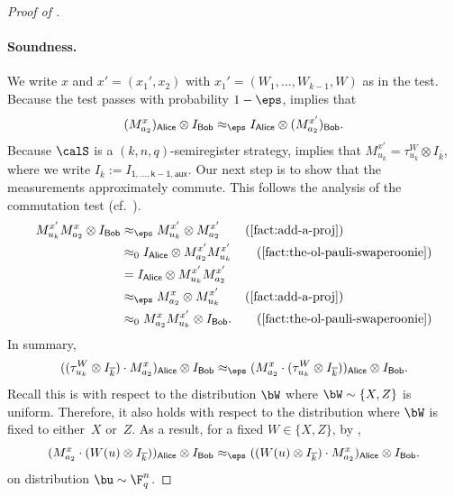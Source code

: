 \documentclass[11pt]{article}
\newcommand{\reg}[1]{{\mathsf{#1}}}
\begin{document}
\begin{proof}[Proof of ]
\paragraph{Soundness.}
We write $x$ and $x' = (x_1', x_2)$ with $x_1' = (W_1, \ldots, W_{k-1}, W)$ as in the test.
Because the test passes with probability $1-\eps$,  implies that
\begin{equation*}
(M_{a_2}^{x})_{\reg{Alice}} \otimes I_{\reg{Bob}}
\approx_{\eps} I_{\reg{Alice}} \otimes (M_{a_2}^{x'})_{\reg{Bob}}.
\end{equation*}
Because $\calS$ is a $(k,n,q)$-semiregister strategy, 
 implies that $M_{u_k}^{x'} = \tau^{W}_{u_k} \otimes I_{\overline{k}}$,
where we write $I_{\overline{k}} := I_{\reg{1, \ldots, k-1, aux}}$.
Our next step is to show that the measurements approximately commute.
This follows the analysis of the commutation test (cf.~\cite[Lemma 28]{CGJV18}).
\begin{align*}
M_{u_k}^{x'} M_{a_2}^{x} \otimes I_{\reg{Bob}}
&\approx_{\eps} M_{u_k}^{x'} \otimes M_{a_2}^{x'}\tag{\Cref{fact:add-a-proj}}\\
&\approx_{0} I_{\reg{Alice}} \otimes M_{a_2}^{x'}M_{u_k}^{x'} \tag{\Cref{fact:the-ol-pauli-swaperoonie}}\\
&= I_{\reg{Alice}} \otimes M_{u_k}^{x'}M_{a_2}^{x'}\\
&\approx_{\eps} M_{a_2}^{x} \otimes M_{u_k}^{x'}\tag{\Cref{fact:add-a-proj}}\\
&\approx_{0} M_{a_2}^x M_{u_k}^{x'} \otimes I_{\reg{Bob}}.\tag{\Cref{fact:the-ol-pauli-swaperoonie}}
\end{align*}
In summary,
\begin{equation*}
((\tau^{W}_{u_k} \otimes I_{\overline{k}})\cdot M_{a_2}^{x})_{\reg{Alice}} \otimes I_{\reg{Bob}}
\approx_{\eps} (M_{a_2}^x \cdot (\tau^{W}_{u_k} \otimes I_{\overline{k}}))_{\reg{Alice}}\otimes I_{\reg{Bob}}.
\end{equation*}
Recall this is with respect to the distribution $\bW$ where $\bW \sim \{X,Z\}$ is uniform.
Therefore, it also holds with respect to the distribution where $\bW$ is fixed to either~$X$ or~$Z$.
As a result, for a fixed $W \in \{X,Z\}$, by , 
\begin{equation*}
(M_{a_2}^x \cdot ( W(u)\otimes I_{\overline{k}}))_{\reg{Alice}} \otimes I_{\reg{Bob}}
\approx_{\eps} (( W(u)\otimes I_{\overline{k}}) \cdot M_{a_2}^x)_{\reg{Alice}} \otimes I_{\reg{Bob}}.
\end{equation*}
on distribution $\bu \sim \F_q^n$.

\end{proof}
\end{document}
